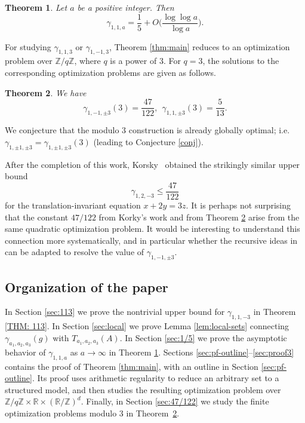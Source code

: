\documentclass[12pt, notitlepage]{amsart}
\numberwithin{equation}{section}
\def\R{\mathbb R}
\def\Z{\mathbb Z}
\newtheorem{theorem}{Theorem}[section]
\theoremstyle{remark}
\theoremstyle{definition}
\theoremstyle{remark}
\numberwithin{equation}{section}
\begin{document}
\begin{theorem}\label{thm:1/5}
Let $a$ be a positive integer. Then
$$
\gamma_{1,1,a} = \frac{1}{5} + O\Big(\frac{\log\log a}{\log a}\Big).
$$
\end{theorem}

For studying $\gamma_{1,1,3}$ or $\gamma_{1,-1,3}$, Theorem \ref{thm:main} reduces to an optimization problem over $\Z/q\Z$, where $q$ is a power of $3$. For $q=3$, the solutions to the corresponding optimization problems are given as follows.

\begin{theorem}\label{thm:gamma113}
We have
$$
\gamma_{1,-1,\pm 3}(3) = \frac{47}{122}, \ \ \gamma_{1,1,\pm 3}(3) = \frac{5}{13}.
$$
\end{theorem}

We conjecture that the modulo $3$ construction is already globally optimal; i.e. $\gamma_{1,\pm 1, \pm 3} = \gamma_{1,\pm 1,\pm 3}(3)$ (leading to Conjecture \ref{conj}).

After the completion of this work, Korsky~\cite{Korsky} obtained the
strikingly similar upper bound
$$
    \gamma_{1,2,-3}\leq\frac{47}{122}
$$
for the translation-invariant equation $x+2y=3z$.
It is perhaps not surprising that the constant $47/122$ from Korky's work and from Theorem \ref{thm:gamma113} arise from the same quadratic optimization problem. It would be interesting to understand this connection more systematically, and in
particular whether the recursive ideas in~\cite{Korsky} can be adapted
to resolve the value of $\gamma_{1,-1,\pm 3}$.

\subsection*{Organization of the paper}

In Section \ref{sec:113} we prove the nontrivial upper bound for $\gamma_{1,1,-3}$ in Theorem \ref{THM: 113}.  In Section \ref{sec:local} we prove Lemma \ref{lem:local-sets} connecting $\gamma_{a_1,a_2,a_3}(g)$ with $T_{a_1,a_2,a_3}(A)$. In Section \ref{sec:1/5} we prove the asymptotic behavior of $\gamma_{1,1,a}$ as $a\rightarrow\infty$ in Theorem \ref{thm:1/5}. Sections \ref{sec:pf-outline}--\ref{sec:proof3} contains the proof of Theorem \ref{thm:main}, with an outline in Section \ref{sec:pf-outline}. Its proof uses arithmetic regularity to reduce an arbitrary set to a structured model,  and then studies the resulting optimization problem over $\Z/q\Z \times \R \times (\R/\Z)^d$.  Finally, in Section \ref{sec:47/122} we
study the finite optimization problems modulo $3$ in Theorem~\ref{thm:gamma113}.
\end{document}
